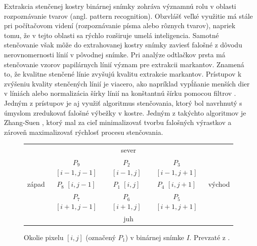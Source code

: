   Extrakcia stenčenej kostry binárnej snímky zohráva významnú rolu v oblasti rozpoznávanie tvarov (angl. pattern recognition). Obzvlášť veľké využitie má stále
  pri počítačovom videní (rozpoznávanie písma alebo rôznych tvarov), napriek tomu, že v tejto oblasti sa rýchlo rozširuje umelá inteligencia.
  Samotné stenčovanie však môže do extrahovanej kostry snímky zaviesť falošné  z dôvodu nerovnomernosti línií v pôvodnej snímke.
  Pri analýze odtlačkov prsta má stenčovanie vzorov papilárnych línií význam pre extrakcii markantov. Znamená to, že kvalitne stenčené línie zvyšujú kvalitu
  extrakcie markantov. Prístupov k zvýšeniu kvality stenčených línií je viacero, ako napríklad vypĺňanie menších dier v líniách alebo normalizácia šírky
  línií na konštantnú šírku pomocou filtrov \cite{Handbook}. Jedným z prístupov je aj využiť algoritmus stenčovania, ktorý bol navrhnutý s úmyslom zredukovať
  falošné výbežky v kostre. Jedným z takýchto algoritmov je Zhang-Suen \cite{ZhangSuen_thinning}, ktorý mal za cieľ minimalizovať tvorbu falošných výrastkov
  a zároveň maximalizovať rýchlosť procesu stenčovania.
  
  \begin{figure}[h]
    \centering
      \begin{tabular}{ l | c | c | c | l }
        \multicolumn{5}{c}{sever} \\
        \cline{2-4}
        & \makecell{$P_9$ \\ $[i-1,j-1]$} & \makecell{$P_2$ \\ $[i-1,j]$} & \makecell{$P_3$ \\ $[i-1,j+1]$} \\ \cline{2-4}
        západ & \makecell{$P_8$ \\ $[i,j-1]$} & \makecell{$P_1$ \\ $[i,j]$} & \makecell{$P_4$ \\ $[i,j+1]$} & východ \\ \cline{2-4}
        & \makecell{$P_7$ \\ $[i+1,j-1]$} & \makecell{$P_6$ \\ $[i+1,j]$} & \makecell{$P_5$ \\ $[i+1,j+1]$} \\
        \cline{2-4}
        \multicolumn{5}{c}{juh}
      \end{tabular}
    \caption{Okolie pixelu $[i,j]$ (označený $P_1$) v binárnej snímke $I$. Prevzaté z \cite{ZhangSuen_thinning}.}
    \label{obr:okolie_ZhangSuen}
  \end{figure}

